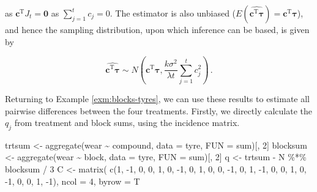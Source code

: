 \documentclass[
]{book}
\newenvironment{Shaded}{\begin{snugshade}}{\end{snugshade}}
\newcommand{\AttributeTok}[1]{\textcolor[rgb]{0.77,0.63,0.00}{#1}}
\newcommand{\DecValTok}[1]{\textcolor[rgb]{0.00,0.00,0.81}{#1}}
\newcommand{\FunctionTok}[1]{\textcolor[rgb]{0.00,0.00,0.00}{#1}}
\newcommand{\NormalTok}[1]{#1}
\newcommand{\OtherTok}[1]{\textcolor[rgb]{0.56,0.35,0.01}{#1}}
\newcommand{\SpecialCharTok}[1]{\textcolor[rgb]{0.00,0.00,0.00}{#1}}
\theoremstyle{definition}
\theoremstyle{definition}
\theoremstyle{definition}
\theoremstyle{definition}
\theoremstyle{remark}
\begin{document}
as \(\boldsymbol{c}^{\mathrm{T}}J_t = \boldsymbol{0}\) as \(\sum_{j=1}^tc_j = 0\). The estimator is also unbiased (\(E(\widehat{\boldsymbol{c}^{\mathrm{T}}\boldsymbol{\tau}}) = \boldsymbol{c}^{\mathrm{T}}\boldsymbol{\tau}\)), and hence the sampling distribution, upon which inference can be based, is given by

\[
\widehat{\boldsymbol{c}^{\mathrm{T}}\boldsymbol{\tau}} \sim N\left(\boldsymbol{c}^{\mathrm{T}}\boldsymbol{\tau}, \frac{k\sigma^2}{\lambda t}\sum_{j=1}^t c_j^2\right)\,.
\]

Returning to Example \ref{exm:blocks-tyres}, we can use these results to estimate all pairwise differences between the four treatments. Firstly, we directly calculate the \(q_j\) from treatment and block sums, using the incidence matrix.

\begin{Shaded}
\begin{Highlighting}[]
\NormalTok{trtsum }\OtherTok{\textless{}{-}} \FunctionTok{aggregate}\NormalTok{(wear }\SpecialCharTok{\textasciitilde{}}\NormalTok{ compound, }\AttributeTok{data =}\NormalTok{ tyre, }\AttributeTok{FUN =}\NormalTok{ sum)[, }\DecValTok{2}\NormalTok{]}
\NormalTok{blocksum }\OtherTok{\textless{}{-}} \FunctionTok{aggregate}\NormalTok{(wear }\SpecialCharTok{\textasciitilde{}}\NormalTok{ block, }\AttributeTok{data =}\NormalTok{ tyre, }\AttributeTok{FUN =}\NormalTok{ sum)[, }\DecValTok{2}\NormalTok{]}
\NormalTok{q }\OtherTok{\textless{}{-}}\NormalTok{ trtsum }\SpecialCharTok{{-}}\NormalTok{ N }\SpecialCharTok{\%*\%}\NormalTok{ blocksum }\SpecialCharTok{/} \DecValTok{3}
\NormalTok{C }\OtherTok{\textless{}{-}} \FunctionTok{matrix}\NormalTok{(}
  \FunctionTok{c}\NormalTok{(}\DecValTok{1}\NormalTok{, }\SpecialCharTok{{-}}\DecValTok{1}\NormalTok{, }\DecValTok{0}\NormalTok{, }\DecValTok{0}\NormalTok{,}
    \DecValTok{1}\NormalTok{, }\DecValTok{0}\NormalTok{, }\SpecialCharTok{{-}}\DecValTok{1}\NormalTok{, }\DecValTok{0}\NormalTok{,}
    \DecValTok{1}\NormalTok{, }\DecValTok{0}\NormalTok{, }\DecValTok{0}\NormalTok{, }\SpecialCharTok{{-}}\DecValTok{1}\NormalTok{,}
    \DecValTok{0}\NormalTok{, }\DecValTok{1}\NormalTok{, }\SpecialCharTok{{-}}\DecValTok{1}\NormalTok{, }\DecValTok{0}\NormalTok{,}
    \DecValTok{0}\NormalTok{, }\DecValTok{1}\NormalTok{, }\DecValTok{0}\NormalTok{, }\SpecialCharTok{{-}}\DecValTok{1}\NormalTok{,}
    \DecValTok{0}\NormalTok{, }\DecValTok{0}\NormalTok{, }\DecValTok{1}\NormalTok{, }\SpecialCharTok{{-}}\DecValTok{1}\NormalTok{),}
  \AttributeTok{ncol =} \DecValTok{4}\NormalTok{, }\AttributeTok{byrow =}\NormalTok{ T}

\end{Highlighting}
\end{Shaded}
\end{document}
